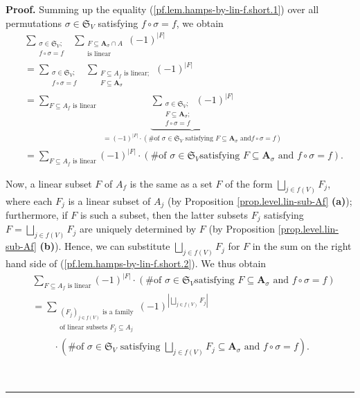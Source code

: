 \documentclass[numbers=enddot,12pt,final,onecolumn,notitlepage]{scrartcl}%
\numberwithin{exer}{section}
\theoremstyle{definition}
\newenvironment{proof}[1][Proof]{\noindent\textbf{#1.} }{\ \rule{0.5em}{0.5em}}
\let\sumnonlimits\sum
\let\sqcupnonlimits\bigsqcup
\renewcommand{\sum}{\sumnonlimits\limits}
\renewcommand{\bigsqcup}{\sqcupnonlimits\limits}
\newenvironment{vershort}{}{}
\begin{document}
\begin{vershort}
\begin{proof}
Summing up the equality (\ref{pf.lem.hamps-by-lin-f.short.1}) over all
permutations $\sigma\in\mathfrak{S}_{V}$ satisfying $f\circ\sigma=f$, we
obtain
\begin{align}
&  \sum_{\substack{\sigma\in\mathfrak{S}_{V};\\f\circ\sigma=f}}\ \ \sum
_{\substack{F\subseteq\mathbf{A}_{\sigma}\cap A\\\text{is linear}}}\left(
-1\right)  ^{\left\vert F\right\vert }\nonumber\\
&  =\sum_{\substack{\sigma\in\mathfrak{S}_{V};\\f\circ\sigma=f}}\ \ \sum
_{\substack{F\subseteq A_{f}\text{ is linear};\\F\subseteq\mathbf{A}_{\sigma}%
}}\left(  -1\right)  ^{\left\vert F\right\vert }\nonumber\\
&  =\sum_{F\subseteq A_{f}\text{ is linear}}\ \ \underbrace{\sum
_{\substack{\sigma\in\mathfrak{S}_{V};\\F\subseteq\mathbf{A}_{\sigma}%
;\\f\circ\sigma=f}}\left(  -1\right)  ^{\left\vert F\right\vert }}_{=\left(
-1\right)  ^{\left\vert F\right\vert }\cdot\left(  \text{\# of }\sigma
\in\mathfrak{S}_{V}\text{ satisfying }F\subseteq\mathbf{A}_{\sigma}\text{ and
}f\circ\sigma=f\right)  }\nonumber\\
&  =\sum_{F\subseteq A_{f}\text{ is linear}}\left(  -1\right)  ^{\left\vert
F\right\vert }\cdot\left(  \text{\# of }\sigma\in\mathfrak{S}_{V}\text{
satisfying }F\subseteq\mathbf{A}_{\sigma}\text{ and }f\circ\sigma=f\right)  .
\label{pf.lem.hamps-by-lin-f.short.2}%
\end{align}


Now, a linear subset $F$ of $A_{f}$ is the same as a set $F$ of the form
$\bigsqcup_{j\in f\left(  V\right)  }F_{j}$, where each $F_{j}$ is a linear
subset of $A_{j}$ (by Proposition \ref{prop.level.lin-sub-Af} \textbf{(a)});
furthermore, if $F$ is such a subset, then the latter subsets $F_{j}$
satisfying $F=\bigsqcup_{j\in f\left(  V\right)  }F_{j}$ are uniquely
determined by $F$ (by Proposition \ref{prop.level.lin-sub-Af} \textbf{(b)}).
Hence, we can substitute $\bigsqcup_{j\in f\left(  V\right)  }F_{j}$ for $F$
in the sum on the right hand side of (\ref{pf.lem.hamps-by-lin-f.short.2}). We
thus obtain%
\begin{align}
&  \sum_{F\subseteq A_{f}\text{ is linear}}\left(  -1\right)  ^{\left\vert
F\right\vert }\cdot\left(  \text{\# of }\sigma\in\mathfrak{S}_{V}\text{
satisfying }F\subseteq\mathbf{A}_{\sigma}\text{ and }f\circ\sigma=f\right)
\nonumber\\
&  =\sum_{\substack{\left(  F_{j}\right)  _{j\in f\left(  V\right)  }\text{ is
a family}\\\text{of linear subsets }F_{j}\subseteq A_{j}}}\left(  -1\right)
^{\left\vert \bigsqcup_{j\in f\left(  V\right)  }F_{j}\right\vert }\nonumber\\
&  \ \ \ \ \ \ \ \ \ \ \cdot\left(  \text{\# of }\sigma\in\mathfrak{S}%
_{V}\text{ satisfying }\bigsqcup_{j\in f\left(  V\right)  }F_{j}%
\subseteq\mathbf{A}_{\sigma}\text{ and }f\circ\sigma=f\right)  .
\label{pf.lem.hamps-by-lin-f.short.5}%
\end{align}



\end{proof}
\end{vershort}
\end{document}
